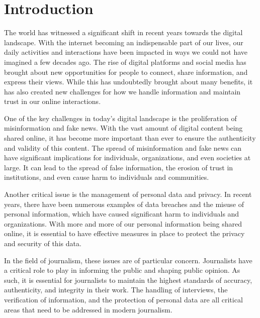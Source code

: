 \documentclass[target=mst,aauheader=]{thud}
\begin{document}

\chapter{Introduction}

The world has witnessed a significant shift in recent years towards the digital landscape. With the internet becoming an indispensable part of our lives, our daily activities and interactions have been impacted in ways we could not have imagined a few decades ago. The rise of digital platforms and social media has brought about new opportunities for people to connect, share information, and express their views. While this has undoubtedly brought about many benefits, it has also created new challenges for how we handle information and maintain trust in our online interactions.\par
One of the key challenges in today's digital landscape is the proliferation of misinformation and fake news. With the vast amount of digital content being shared online, it has become more important than ever to ensure the authenticity and validity of this content. The spread of misinformation and fake news can have significant implications for individuals, organizations, and even societies at large. It can lead to the spread of false information, the erosion of trust in institutions, and even cause harm to individuals and communities.\par
Another critical issue is the management of personal data and privacy. In recent years, there have been numerous examples of data breaches and the misuse of personal information, which have caused significant harm to individuals and organizations. With more and more of our personal information being shared online, it is essential to have effective measures in place to protect the privacy and security of this data.\par
In the field of journalism, these issues are of particular concern. Journalists have a critical role to play in informing the public and shaping public opinion. As such, it is essential for journalists to maintain the highest standards of accuracy, authenticity, and integrity in their work. The handling of interviews, the verification of information, and the protection of personal data are all critical areas that need to be addressed in modern journalism.\par
\end{document}
